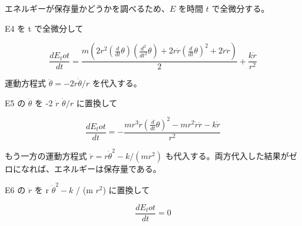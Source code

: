 \documentclass[dvipdfmx,a4paper,11pt]{jsarticle}
\begin{document}
エネルギーが保存量かどうかを調べるため、$E$ を時間 $t$ で全微分する。

E4 を t で全微分して

\begin{equation}
  \frac{dE_tot}{dt} = \frac{m \left(2 r^2 \left(\frac{d}{d t} \theta\right) \left(\frac{d^2}{d t^2} \theta\right)+2 r \dot{r} \left(\frac{d}{d t} \theta\right)^2+2 \dot{r} \ddot{r}\right)}{2}+\frac{k \dot{r}}{r^2}
  \label{eq:E5}
\end{equation}

運動方程式 $\ddot\theta=-2\dot r\dot\theta/r$ を代入する。

E5 の $\ddot{\theta}$ を -2 $\dot{r}$ $\dot{\theta} / r$ に置換して

\begin{equation}
  \frac{dE_tot}{dt} = -\frac{m r^3 \dot{r} \left(\frac{d}{d t} \theta\right)^2-m r^2 \dot{r} \ddot{r}-k \dot{r}}{r^2}
  \label{eq:E6}
\end{equation}

もう一方の運動方程式 $\ddot r=r\dot\theta^2-k/(mr^2)$ も代入する。両方代入した結果がゼロになれば、エネルギーは保存量である。

E6 の $\ddot{r}$ を r $\dot{\theta}^2 - k$ / (m $r^2$) に置換して

\begin{equation}
  \frac{dE_tot}{dt} = 0
  \label{eq:E7}
\end{equation}
\end{document}
